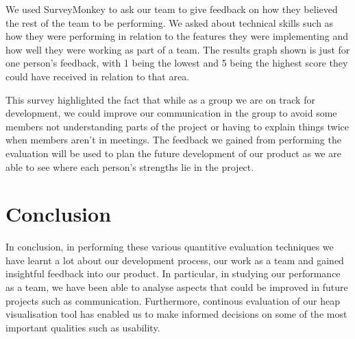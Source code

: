 \documentclass[10pt, a4paper]{article}
\begin{document}
We used SurveyMonkey to ask our team to give feedback on how they believed the rest of the team to be performing. We asked about technical skills such as how they were performing in relation to the features they were implementing and how well they were working as part of a team. The results graph shown is just for one person’s feedback, with 1 being the lowest and 5 being the highest score they could have received in relation to that area. 

This survey highlighted the fact that while as a group we are on track for development, we could improve our communication in the group to avoid some members not understanding parts of the project or having to explain things twice when members aren’t in meetings. The feedback we gained from performing the evaluation will be used to plan the future development of our product as we are able to see where each person’s strengths lie in the project.

\section{Conclusion}
In conclusion, in performing these various quantitive evaluation techniques we have learnt a lot about our development process, our work as a team and gained insightful feedback into our product. In particular, in studying our performance as a team, we have been able to analyse aspects that could be improved in future projects such as communication. Furthermore, continous evaluation of our heap visualisation tool has enabled us to make informed decisions on some of the most important qualities such as usability.
\end{document}
